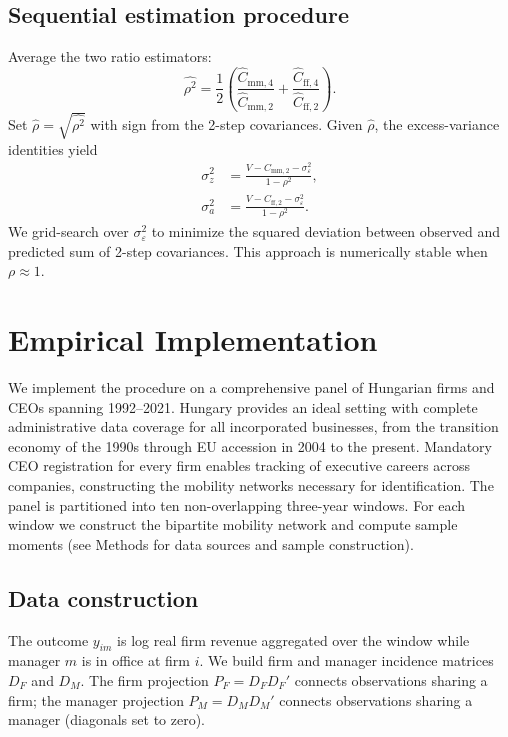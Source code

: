 \documentclass[9pt,twocolumn,twoside]{pnas-new}
\begin{document}
\subsection*{Sequential estimation procedure}
Average the two ratio estimators:
\begin{equation}
 \widehat{\rho^2} = \frac{1}{2}\left(\frac{\widehat C_{\text{mm},4}}{\widehat C_{\text{mm},2}} + \frac{\widehat C_{\text{ff},4}}{\widehat C_{\text{ff},2}}\right).
\end{equation}
Set $\widehat\rho = \sqrt{\widehat{\rho^2}}$ with sign from the 2-step covariances. Given $\widehat\rho$, the excess-variance identities yield
\begin{align}
 \sigma_z^2 &= \frac{V - C_{\text{mm},2} - \sigma_\varepsilon^2}{1 - \rho^2}, \\
 \sigma_a^2 &= \frac{V - C_{\text{ff},2} - \sigma_\varepsilon^2}{1 - \rho^2}.
\end{align}
We grid-search over $\sigma_\varepsilon^2$ to minimize the squared deviation between observed and predicted sum of 2-step covariances. This approach is numerically stable when $\rho \approx 1$.

\section*{Empirical Implementation}

We implement the procedure on a comprehensive panel of Hungarian firms and CEOs spanning 1992--2021. Hungary provides an ideal setting with complete administrative data coverage for all incorporated businesses, from the transition economy of the 1990s through EU accession in 2004 to the present. Mandatory CEO registration for every firm enables tracking of executive careers across companies, constructing the mobility networks necessary for identification. The panel is partitioned into ten non-overlapping three-year windows. For each window we construct the bipartite mobility network and compute sample moments (see Methods for data sources and sample construction).

\subsection*{Data construction}
The outcome $y_{im}$ is log real firm revenue aggregated over the window while manager $m$ is in office at firm $i$. We build firm and manager incidence matrices $D_F$ and $D_M$. The firm projection $P_F = D_F D_F'$ connects observations sharing a firm; the manager projection $P_M = D_M D_M'$ connects observations sharing a manager (diagonals set to zero). 
\end{document}
